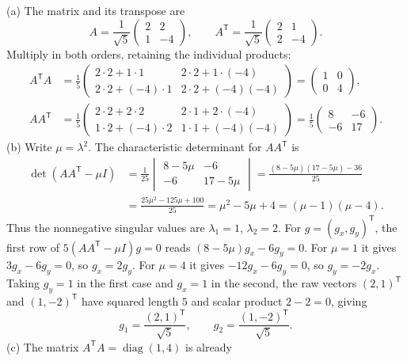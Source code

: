 (a) The matrix and its transpose are
\[
A=\frac1{\sqrt5}\begin{pmatrix}2&2\\1&-4\end{pmatrix},\qquad
A^{\mathsf T}=\frac1{\sqrt5}\begin{pmatrix}2&1\\2&-4\end{pmatrix}.
\]
Multiply in both orders, retaining the individual products:
\begin{align*}
A^{\mathsf T}A
&=\frac15\begin{pmatrix}
2\cdot2+1\cdot1&2\cdot2+1\cdot(-4)\\
2\cdot2+(-4)\cdot1&2\cdot2+(-4)(-4)
\end{pmatrix}
=\begin{pmatrix}1&0\\0&4\end{pmatrix},\\
AA^{\mathsf T}
&=\frac15\begin{pmatrix}
2\cdot2+2\cdot2&2\cdot1+2\cdot(-4)\\
1\cdot2+(-4)\cdot2&1\cdot1+(-4)(-4)
\end{pmatrix}
=\frac15\begin{pmatrix}8&-6\\-6&17\end{pmatrix}.
\end{align*}
(b) Write $\mu=\lambda^2$. The characteristic determinant for
$AA^{\mathsf T}$ is
\begin{align*}
\det(AA^{\mathsf T}-\mu I)
&=\frac{1}{25}\begin{vmatrix}8-5\mu&-6\\-6&17-5\mu\end{vmatrix}
=\frac{(8-5\mu)(17-5\mu)-36}{25}\\
&=\frac{25\mu^2-125\mu+100}{25}
=\mu^2-5\mu+4=(\mu-1)(\mu-4).
\end{align*}
Thus the nonnegative singular values are $\lambda_1=1$, $\lambda_2=2$.
For $g=(g_x,g_y)^{\mathsf T}$, the first row of
$5(AA^{\mathsf T}-\mu I)g=0$ reads $(8-5\mu)g_x-6g_y=0$.
For $\mu=1$ it gives $3g_x-6g_y=0$, so $g_x=2g_y$.
For $\mu=4$ it gives $-12g_x-6g_y=0$, so $g_y=-2g_x$.
Taking $g_y=1$ in the first case and $g_x=1$ in the second, the raw
vectors $(2,1)^{\mathsf T}$ and $(1,-2)^{\mathsf T}$ have squared
length $5$ and scalar product $2-2=0$, giving
\[
g_1=\frac{(2,1)^{\mathsf T}}{\sqrt5},\qquad
 g_2=\frac{(1,-2)^{\mathsf T}}{\sqrt5}.
\]
(c) The matrix $A^{\mathsf T}A=\operatorname{diag}(1,4)$ is already
